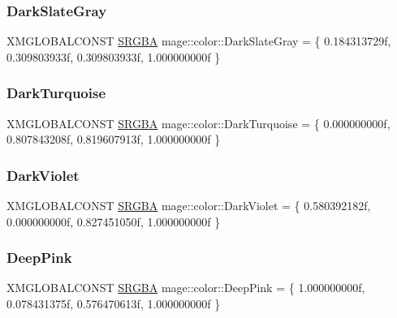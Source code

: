 \hypertarget{namespacemage_1_1color_a9063445567fdec3ac2f7916b4f1989ef}{}\label{namespacemage_1_1color_a9063445567fdec3ac2f7916b4f1989ef} 
\subsubsection{\texorpdfstring{Dark\+Slate\+Gray}{DarkSlateGray}}
{\footnotesize\ttfamily X\+M\+G\+L\+O\+B\+A\+L\+C\+O\+N\+ST \hyperlink{structmage_1_1_s_r_g_b_a}{S\+R\+G\+BA} mage\+::color\+::\+Dark\+Slate\+Gray = \{ 0.\+184313729f, 0.\+309803933f, 0.\+309803933f, 1.\+000000000f \}}

\hypertarget{namespacemage_1_1color_a20b64f764acf8eaa468226d2b6d28fbc}{}\label{namespacemage_1_1color_a20b64f764acf8eaa468226d2b6d28fbc} 
\subsubsection{\texorpdfstring{Dark\+Turquoise}{DarkTurquoise}}
{\footnotesize\ttfamily X\+M\+G\+L\+O\+B\+A\+L\+C\+O\+N\+ST \hyperlink{structmage_1_1_s_r_g_b_a}{S\+R\+G\+BA} mage\+::color\+::\+Dark\+Turquoise = \{ 0.\+000000000f, 0.\+807843208f, 0.\+819607913f, 1.\+000000000f \}}

\hypertarget{namespacemage_1_1color_a667ce7c4545617295769b7f87570a307}{}\label{namespacemage_1_1color_a667ce7c4545617295769b7f87570a307} 
\subsubsection{\texorpdfstring{Dark\+Violet}{DarkViolet}}
{\footnotesize\ttfamily X\+M\+G\+L\+O\+B\+A\+L\+C\+O\+N\+ST \hyperlink{structmage_1_1_s_r_g_b_a}{S\+R\+G\+BA} mage\+::color\+::\+Dark\+Violet = \{ 0.\+580392182f, 0.\+000000000f, 0.\+827451050f, 1.\+000000000f \}}

\hypertarget{namespacemage_1_1color_a7d979d0bc941056d06217ad624b7c7f3}{}\label{namespacemage_1_1color_a7d979d0bc941056d06217ad624b7c7f3} 
\subsubsection{\texorpdfstring{Deep\+Pink}{DeepPink}}
{\footnotesize\ttfamily X\+M\+G\+L\+O\+B\+A\+L\+C\+O\+N\+ST \hyperlink{structmage_1_1_s_r_g_b_a}{S\+R\+G\+BA} mage\+::color\+::\+Deep\+Pink = \{ 1.\+000000000f, 0.\+078431375f, 0.\+576470613f, 1.\+000000000f \}}

